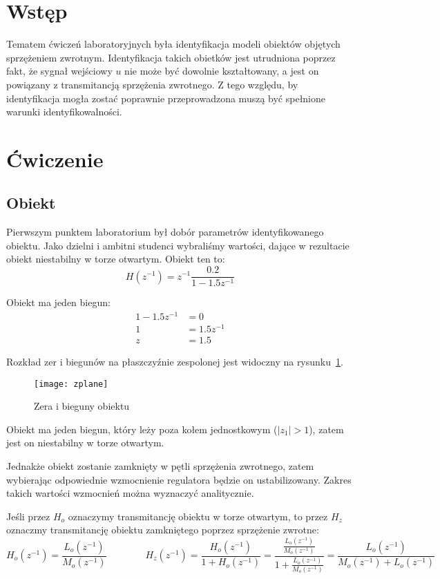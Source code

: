 \documentclass[11pt, a4paper]{article}
\begin{document}
\setcounter{page}{2}

\newpage

\section{Wstęp}

Tematem ćwiczeń laboratoryjnych była identyfikacja modeli obiektów objętych sprzężeniem zwrotnym.
Identyfikacja takich obietków jest utrudniona poprzez fakt, że sygnał wejściowy $u$ nie może być dowolnie kształtowany, a jest on powiązany z transmitancją sprzężenia zwrotnego. Z tego względu, by identyfikacja mogła zostać poprawnie przeprowadzona muszą być spełnione warunki identyfikowalności.

\section{Ćwiczenie}

\subsection*{Obiekt}

Pierwszym punktem laboratorium był dobór parametrów identyfikowanego obiektu. Jako dzielni i ambitni studenci wybraliśmy wartości, dające w rezultacie obiekt niestabilny w torze otwartym. Obiekt ten to:
\[
H(z^{-1}) = z^{-1} \frac{0.2}{1 - 1.5 z^{-1}}
\]

Obiekt ma jeden biegun:
\begin{align*}
1 - 1.5 z^{-1} &= 0 \\
1 &= 1.5 z^{-1} \\
z &= 1.5
\end{align*}

Rozkład zer i biegunów na płaszczyźnie zespolonej jest widoczny na rysunku~\ref{fig:z}.
\begin{figure}[htbp!]
	\centering
	\texttt{[image: zplane]}
	\caption{Zera i bieguny obiektu}
	\label{fig:z}
\end{figure}

Obiekt ma jeden biegun, który leży poza kołem jednostkowym ($|z_1| > 1$), zatem jest on niestabilny w torze otwartym.

Jednakże obiekt zostanie zamknięty w pętli sprzężenia zwrotnego, zatem wybierając odpowiednie wzmocnienie regulatora będzie on ustabilizowany. Zakres takich wartości wzmocnień można wyznaczyć analitycznie.

Jeśli przez $H_o$ oznaczymy transmitancję obiektu w torze otwartym, to przez $H_z$ oznaczmy transmitancję obiektu zamkniętego poprzez sprzężenie zwrotne:
\[
	H_o(z^{-1}) = \frac{L_o(z^{-1})}{M_o(z^{-1})} \qquad\qquad
	H_z(z^{-1}) = \frac{H_o(z^{-1})}{1 + H_o(z^{-1})} =
	\frac{\frac{L_o(z^{-1})}{M_o(z^{-1})}}{1 + \frac{L_o(z^{-1})}{M_o(z^{-1})}} =
	\frac{L_o(z^{-1})}{M_o(z^{-1}) + L_o(z^{-1})}
\]
\end{document}
